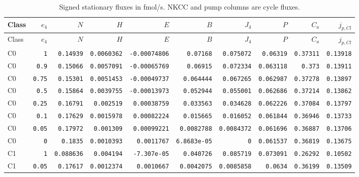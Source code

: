 \begingroup\scriptsize
\setlength{\tabcolsep}{3pt}
\begin{longtable}{lrrrrrrrrr}
\caption{Signed stationary fluxes in fmol/s. NKCC and pump columns are cycle fluxes.}\\
\toprule
Class & $e_4$ & $N$ & $H$ & $E$ & $B$ & $J_4$ & $P$ & $C_a$ & $j_{p,Cl}$ \\
\midrule\endfirsthead
\toprule
Class & $e_4$ & $N$ & $H$ & $E$ & $B$ & $J_4$ & $P$ & $C_a$ & $j_{p,Cl}$ \\
\midrule\endhead
\bottomrule\endfoot
C0 & \texttt{1} & \texttt{0.14939} & \texttt{0.0060362} & \texttt{-0.00074806} & \texttt{0.07168} & \texttt{0.075072} & \texttt{0.06319} & \texttt{0.37311} & \texttt{0.13918} \\
C0 & \texttt{0.9} & \texttt{0.15066} & \texttt{0.0057091} & \texttt{-0.00065769} & \texttt{0.06915} & \texttt{0.072334} & \texttt{0.063118} & \texttt{0.373} & \texttt{0.13911} \\
C0 & \texttt{0.75} & \texttt{0.15301} & \texttt{0.0051453} & \texttt{-0.00049737} & \texttt{0.064444} & \texttt{0.067265} & \texttt{0.062987} & \texttt{0.37278} & \texttt{0.13897} \\
C0 & \texttt{0.5} & \texttt{0.15864} & \texttt{0.0039755} & \texttt{-0.00013973} & \texttt{0.052944} & \texttt{0.055001} & \texttt{0.062686} & \texttt{0.37214} & \texttt{0.13862} \\
C0 & \texttt{0.25} & \texttt{0.16791} & \texttt{0.002519} & \texttt{0.00038759} & \texttt{0.033563} & \texttt{0.034628} & \texttt{0.062226} & \texttt{0.37084} & \texttt{0.13797} \\
C0 & \texttt{0.1} & \texttt{0.17629} & \texttt{0.0015978} & \texttt{0.00082224} & \texttt{0.015665} & \texttt{0.016052} & \texttt{0.061844} & \texttt{0.36946} & \texttt{0.13733} \\
C0 & \texttt{0.05} & \texttt{0.17972} & \texttt{0.001309} & \texttt{0.00099221} & \texttt{0.0082788} & \texttt{0.0084372} & \texttt{0.061696} & \texttt{0.36887} & \texttt{0.13706} \\
C0 & \texttt{0} & \texttt{0.1835} & \texttt{0.0010393} & \texttt{0.0011767} & \texttt{6.8683e-05} & \texttt{0} & \texttt{0.061537} & \texttt{0.36819} & \texttt{0.13675} \\
C1 & \texttt{1} & \texttt{0.088636} & \texttt{0.004194} & \texttt{-7.307e-05} & \texttt{0.040726} & \texttt{0.085719} & \texttt{0.073091} & \texttt{0.26292} & \texttt{0.10502} \\
C1 & \texttt{0.05} & \texttt{0.17617} & \texttt{0.0012374} & \texttt{0.0010667} & \texttt{0.0042075} & \texttt{0.0085858} & \texttt{0.0634} & \texttt{0.36199} & \texttt{0.13509} \\

\end{longtable}
